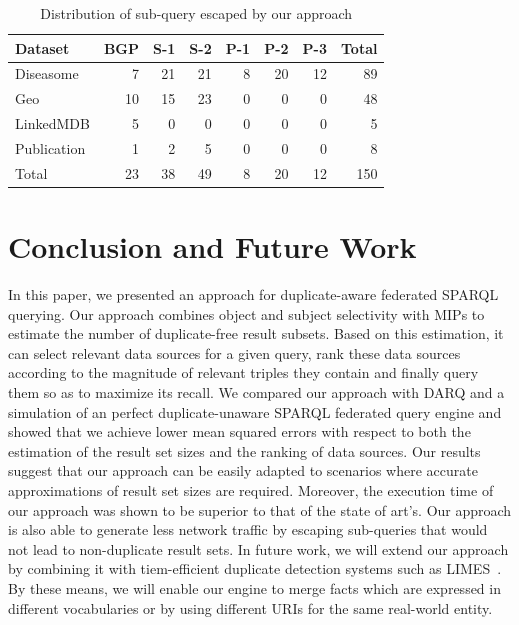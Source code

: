 \documentclass{sig-alternate}  %
\begin{document}
\begin{table}
\centering
\begin{tabular}{lrrrrrrr}
\hline
Dataset		&BGP 	&S-1&S-2&P-1&P-2&P-3&Total \\\hline
Diseasome				&7		&21	&21	&8	&20	&12	&89\\
Geo 	&10		&15	&23	&0	&0	&0	&48\\
LinkedMDB				&5		&0	&0	&0	&0	&0	&5\\
Publication			&1		&2	&5	&0	&0	&0	&8\\\hline
Total 					&23		&38	&49	&8	&20	&12	&150 \\\hline
\end{tabular}
\caption{Distribution of sub-query escaped by our approach}
\label{tab:escaped}
\end{table}


\section{Conclusion and Future Work}
In this paper, we presented an approach for duplicate-aware federated SPARQL querying.
Our approach combines object and subject selectivity with MIPs to estimate the number of duplicate-free result subsets.
Based on this estimation, it can select relevant data sources for a given query, rank these data sources according to the magnitude of relevant triples they contain and finally query them so as to maximize its recall.
We compared our approach with DARQ and a simulation of an perfect duplicate-unaware SPARQL federated query engine and showed that we achieve lower mean squared errors with respect to both the estimation of the result set sizes and the ranking of data sources.
Our results suggest that our approach can be easily adapted to scenarios where accurate approximations of result set sizes are required.
Moreover, the execution time of our approach was shown to be superior to that of the state of art's.
Our approach is also able to generate less network traffic by escaping sub-queries that would not lead to non-duplicate result sets.
In future work, we will extend our approach by combining it with tiem-efficient duplicate detection systems such as LIMES~\cite{key-26}. 
By these means, we will enable our engine to merge facts which are expressed in different vocabularies or by using different URIs for the same real-world entity.
\end{document}
